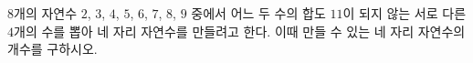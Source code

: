 $8$개의 자연수 $2$, $3$, $4$, $5$, $6$, $7$, $8$, $9$ 중에서 어느 두 수의 합도 $11$이 되지 않는 서로 다른 $4$개의 수를 뽑아 네 자리 자연수를 만들려고 한다. 이때 만들 수 있는 네 자리 자연수의 개수를 구하시오.
